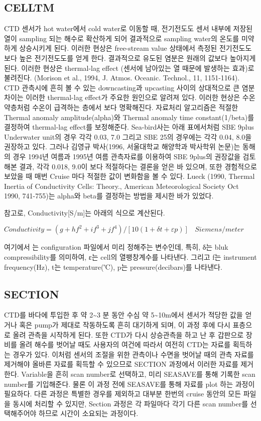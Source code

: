 \documentclass[
]{book}
\begin{document}
\hypertarget{celltm}{%
\subsection{CELLTM}\label{celltm}}

CTD 센서가 hot water에서 cold water로 이동할 때, 전기전도도 센서 내부에 저장된 열이 sampling 되는 해수로 확산하게 되어 결과적으로 sampling water의 온도를 미약하게 상승시키게 된다. 이러한 현상은 free-stream value 상태에서 측정된 전기전도도 보다 높은 전기전도도를 얻게 한다. 결과적으로 유도된 염분은 원래의 값보다 높아지게 된다. 이러한 현상은 thermal-lag effect (센서에 남아있는 열 때문에 발생하는 효과)로 불려진다. (Morison et al., 1994, J. Atmos. Oceanic. Technol., 11, 1151-1164). CTD 관측시에 흔히 볼 수 있는 downcasting과 upcasting 사이의 상대적으로 큰 염분차이는 이러한 thermal-lag effect가 주요한 원인으로 알려져 있다. 이러한 현상은 수온약층처럼 수온이 급격하는 층에서 보다 명확해진다.
자료처리 알고리즘은 적절한 Thermal anomaly amplitude(alpha)와 Thermal anomaly time constant(1/beta)를 결정하여 thermal-lag effect를 보정해준다. Sea-bird사는 아래 표에서처럼 SBE 9plus Underwater unit의 경우 각각 0.03, 7.0 그리고 SBE 25의 경우에는 각각 0.04, 8.0을 권장하고 있다. 그러나 김영규 박사(1996, 서울대학교 해양학과 박사학위 논문)는 동해의 경우 1994년 여름과 1995년 여름 관측자료를 이용하여 SBE 9plus의 권장값을 검토해본 결과, 각각 0.018, 9.0이 보다 적절하다는 결론을 얻은 바 있으며, 또한 경험적으로 보았을 때 매번 Cruise 마다 적절한 값이 변화함을 볼 수 있다. Lueck (1990, Thermal Inertia of Conductivity Cells: Theory., American Meteorological Society Oct 1990, 741-755)는 alpha와 beta를 결정하는 방법을 제시한 바가 있었다.

참고로, Conductivity{[}S/m{]}는 아래의 식으로 계산된다.

\(Conductivity = (g + hf^2 + if^3 + jf^4)/[10(1+ \delta t + \varepsilon p)] ~~~~ Siemens/meter\)

여기에서 는 configuration 파일에서 미리 정해주는 변수인데, 특히, δ는 bluk compressibility를 의미하여, ε는 cell의 열팽창계수를 나타낸다. 그리고 f는 instrument frequency(Hz), t는 temperature(℃), p는 pressure(decibars)를 나타낸다.

\hypertarget{section}{%
\subsection{SECTION}\label{section}}

CTD를 바다에 투입한 후 약 2\textasciitilde3 분 동안 수심 약 5\textasciitilde10m에서 센서가 적당한 값을 얻거나 혹은 pump가 제대로 작동하도록 흔히 대기하게 되며, 이 과정 후에 다시 표층으로 올려 관측을 시작하게 된다. 또한 CTD가 다시 상승관측을 하고 난 후 갑판으로 장비를 올려 해수를 벗어날 때도 사용자의 여건에 따라서 여전히 CTD는 자료를 획득하는 경우가 있다. 이처럼 센서의 조절을 위한 관측이나 수면을 벗어날 때의 관측 자료를 제거해야 올바른 자료를 획득할 수 있으므로 SECTION 과정에서 이러한 자료를 제거한다.
Variable을 흔히 scan number로 선택하고, 미리 SEASAVE를 통해 기록한 scan number를 기입해준다. 물론 이 과정 전에 SEASAVE를 통해 자료를 plot 하는 과정이 필요하다. 다른 과정은 특별한 경우를 제외하고 대부분 한번의 cruise 동안의 모든 파일을 동시에 처리할 수 있지만, Section 과정은 각 파일마다 각기 다른 scan number를 선택해주어야 하므로 시간이 소요되는 과정이다.
\end{document}
